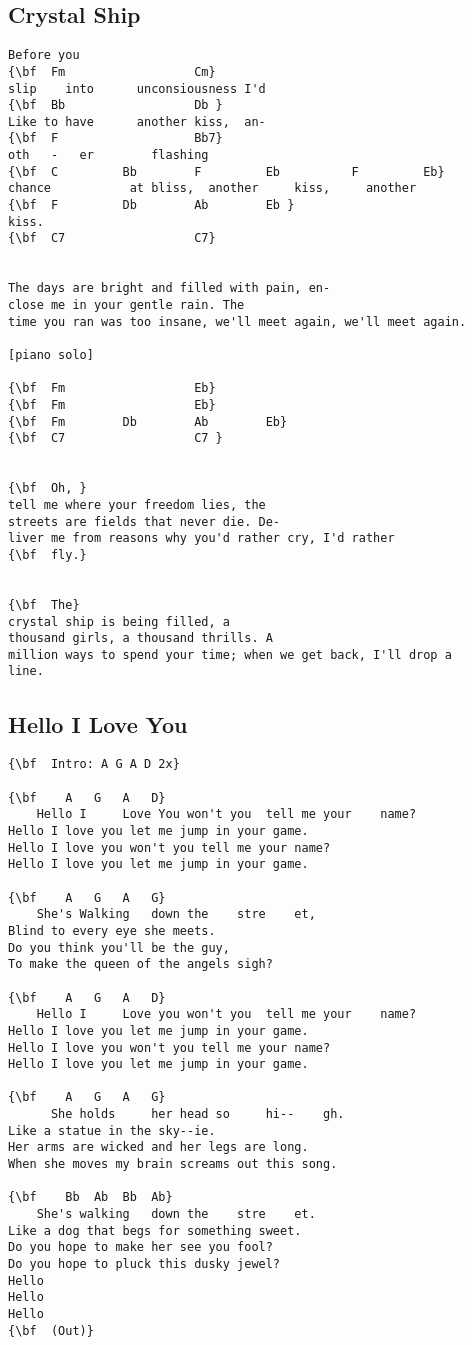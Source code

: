 \documentclass[a4paper]{article}
\begin{document}
\subsection{Crystal Ship}
\begin{Verbatim}[commandchars=\\\{\}]
Before you 
{\bf  Fm                  Cm}
slip    into      unconsiousness I'd
{\bf  Bb                  Db }
Like to have      another kiss,  an-
{\bf  F                   Bb7}
oth   -   er        flashing 
{\bf  C         Bb        F         Eb          F         Eb}
chance           at bliss,  another     kiss,     another
{\bf  F         Db        Ab        Eb }
kiss.
{\bf  C7                  C7}


The days are bright and filled with pain, en-
close me in your gentle rain. The
time you ran was too insane, we'll meet again, we'll meet again.

[piano solo]

{\bf  Fm                  Eb}
{\bf  Fm                  Eb}
{\bf  Fm        Db        Ab        Eb}
{\bf  C7                  C7 }


{\bf  Oh, }
tell me where your freedom lies, the
streets are fields that never die. De-
liver me from reasons why you'd rather cry, I'd rather
{\bf  fly.}


{\bf  The}
crystal ship is being filled, a
thousand girls, a thousand thrills. A
million ways to spend your time; when we get back, I'll drop a 
line. 

\end{Verbatim}
\newpage
\subsection{Hello I Love You}
\begin{Verbatim}[commandchars=\\\{\}]
{\bf  Intro: A G A D 2x}

{\bf   	A	G	A	D}
 	Hello I 	Love You won't you 	tell me your 	name?
Hello I love you let me jump in your game.
Hello I love you won't you tell me your name?
Hello I love you let me jump in your game.

{\bf   	A	G	A	G}
 	She's Walking 	down the 	stre	et,
Blind to every eye she meets.
Do you think you'll be the guy,
To make the queen of the angels sigh?

{\bf   	A	G	A	D}
 	Hello I 	Love you won't you 	tell me your 	name?
Hello I love you let me jump in your game.
Hello I love you won't you tell me your name?
Hello I love you let me jump in your game.

{\bf   	A	G	A	G}
 	  She holds 	her head so 	hi--	gh.
Like a statue in the sky--ie.
Her arms are wicked and her legs are long.
When she moves my brain screams out this song.

{\bf   	Bb	Ab	Bb	Ab}
 	She's walking 	down the 	stre	et.
Like a dog that begs for something sweet.
Do you hope to make her see you fool?
Do you hope to pluck this dusky jewel?
Hello
Hello
Hello
{\bf  (Out)}

\end{Verbatim}
\newpage
\end{document}

